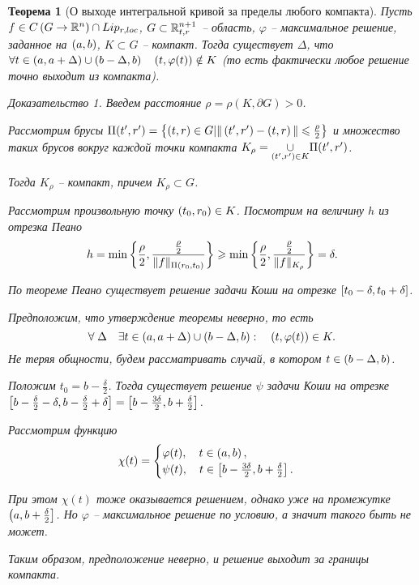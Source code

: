 \documentclass[a5paper, 10pt]{article}
\theoremstyle{definition}
\theoremstyle{plain}
\newtheorem{Th}{Теорема}
\theoremstyle{remark}
\newtheorem*{Proof}{Доказательство}
\begin{document}
	\begin{Th}[О выходе интегральной кривой за пределы любого компакта]
		Пусть $f\in C\left(G\rightarrow \mathbb{R}^n\right) \cap Lip_{r, loc}$, $G\subset \mathbb{R}_{t,r}^{n+1}$ -- область, $\varphi$ -- максимальное решение, заданное на $\left(a,b\right)$, $K \subset G$ -- компакт. Тогда существует $\Delta$, что $\forall t\in\left(a, a+\Delta\right)\cup\left(b-\Delta, b\right) \quad \left(t,\varphi(t)\right) \notin K$ (то есть фактически любое решение точно выходит из компакта).
		\begin{Proof}
				Введем расстояние $\rho = \rho(K, \partial G) > 0$.
		
				Рассмотрим брусы $\Pi(t',r') = \left\{\left(t,r\right)\in G | \|\left(t',r'\right) - \left(t,r\right)\|\leqslant \frac{\rho}{2}\right\}$ и множество таких брусов вокруг каждой точки компакта $K_{\rho} = \underset{\left(t',r'\right)\in K}{\cup} \Pi(t',r')$. 
				
				Тогда $K_{\rho}$ -- компакт, причем $K_{\rho} \subset G$.
				
				Рассмотрим произвольную точку $\left(t_0, r_0\right)\in K$. Посмотрим на величину $h$ из отрезка Пеано
				\[
				h = \min \left\{\frac{\rho}{2}, \frac{\frac{\rho}{2}}{\|f\|_{\Pi\left(r_0, t_0\right)}}\right\} \geqslant \min \left\{\frac{\rho}{2}, \frac{\frac{\rho}{2}}{\|f\|_{K_\rho}}\right\} =\delta.
				\] 
				
				По теореме Пеано существует решение задачи Коши на отрезке $\left[t_0-\delta, t_0+\delta\right]$.
				
				Предположим, что утверждение теоремы неверно, то есть 
				\[
				\forall \; \Delta \quad \exists t \in \left(a, a+\Delta\right) \cup \left(b-\Delta, b\right): \quad \left(t, \varphi(t)\right) \in K.
				\]
				Не теряя общности, будем рассматривать случай, в котором $t\in \left(b-\Delta, b\right)$.
				
				Положим $t_0 = b-\frac{\delta}{2}$. Тогда существует решение $\psi$ задачи Коши на отрезке $\left[b-\frac{\delta}{2} - \delta, b-\frac{\delta}{2}+\delta\right] = \left[b-\frac{3\delta}{2}, b+\frac{\delta}{2}\right]$.
				
				Рассмотрим функцию 
				\[
				\chi(t) = \begin{cases}
					\varphi(t), \quad t \in \left(a,b\right),\\
					\psi(t), \quad t \in \left[b-\frac{3\delta}{2}, b+\frac{\delta}{2}\right].
				\end{cases}
				\]
				
				При этом $\chi(t)$ тоже оказывается решением, однако уже на промежутке $\left(a, b+\frac{\delta}{2}\right]$. Но $\varphi$ -- максимальное решение по условию, а значит такого быть не может.
				
				Таким образом, предположение неверно, и решение выходит за границы компакта.
		\end{Proof}
	\end{Th}
\end{document}
